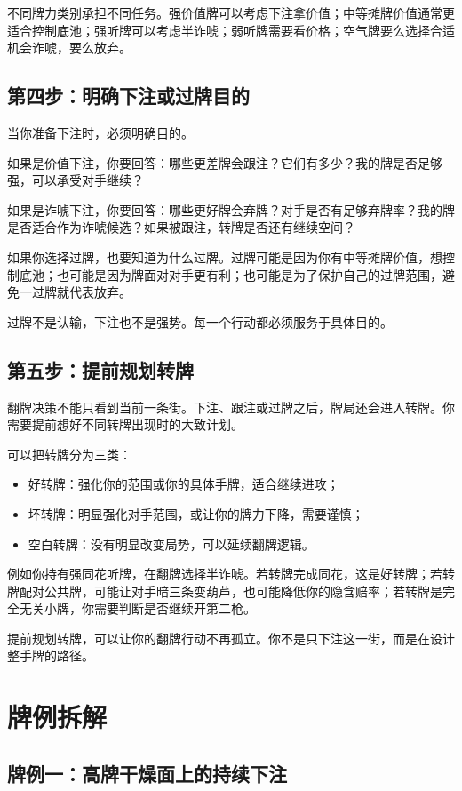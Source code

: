 不同牌力类别承担不同任务。强价值牌可以考虑下注拿价值；中等摊牌价值通常更适合控制底池；强听牌可以考虑半诈唬；弱听牌需要看价格；空气牌要么选择合适机会诈唬，要么放弃。

\subsection{第四步：明确下注或过牌目的}

当你准备下注时，必须明确目的。

如果是价值下注，你要回答：哪些更差牌会跟注？它们有多少？我的牌是否足够强，可以承受对手继续？

如果是诈唬下注，你要回答：哪些更好牌会弃牌？对手是否有足够弃牌率？我的牌是否适合作为诈唬候选？如果被跟注，转牌是否还有继续空间？

如果你选择过牌，也要知道为什么过牌。过牌可能是因为你有中等摊牌价值，想控制底池；也可能是因为牌面对对手更有利；也可能是为了保护自己的过牌范围，避免一过牌就代表放弃。

过牌不是认输，下注也不是强势。每一个行动都必须服务于具体目的。

\subsection{第五步：提前规划转牌}

翻牌决策不能只看到当前一条街。下注、跟注或过牌之后，牌局还会进入转牌。你需要提前想好不同转牌出现时的大致计划。

可以把转牌分为三类：

\begin{itemize}
\item 好转牌：强化你的范围或你的具体手牌，适合继续进攻；
\item 坏转牌：明显强化对手范围，或让你的牌力下降，需要谨慎；
\item 空白转牌：没有明显改变局势，可以延续翻牌逻辑。
\end{itemize}

例如你持有强同花听牌，在翻牌选择半诈唬。若转牌完成同花，这是好转牌；若转牌配对公共牌，可能让对手暗三条变葫芦，也可能降低你的隐含赔率；若转牌是完全无关小牌，你需要判断是否继续开第二枪。

提前规划转牌，可以让你的翻牌行动不再孤立。你不是只下注这一街，而是在设计整手牌的路径。

\section{牌例拆解}

\subsection{牌例一：高牌干燥面上的持续下注}

